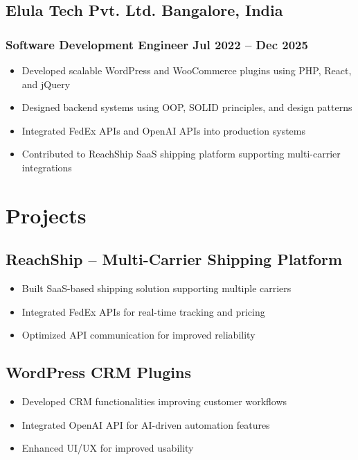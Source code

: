 \documentclass[11pt]{article}
\begin{document}
\subsection{Elula Tech Pvt. Ltd. \hfill Bangalore, India}
\subsubsection{Software Development Engineer \hfill Jul 2022 -- Dec 2025}
\begin{itemize}
\item Developed scalable WordPress and WooCommerce plugins using PHP, React, and jQuery
\item Designed backend systems using OOP, SOLID principles, and design patterns
\item Integrated FedEx APIs and OpenAI APIs into production systems
\item Contributed to ReachShip SaaS shipping platform supporting multi-carrier integrations
\end{itemize}

\section{Projects}

\subsection{ReachShip – Multi-Carrier Shipping Platform \hfill}
\begin{itemize}
\item Built SaaS-based shipping solution supporting multiple carriers
\item Integrated FedEx APIs for real-time tracking and pricing
\item Optimized API communication for improved reliability
\end{itemize}

\subsection{WordPress CRM Plugins}
\begin{itemize}
\item Developed CRM functionalities improving customer workflows
\item Integrated OpenAI API for AI-driven automation features
\item Enhanced UI/UX for improved usability
\end{itemize}
\end{document}
